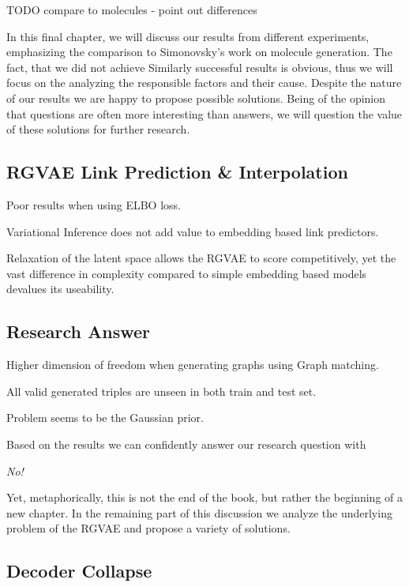 
TODO compare to molecules - point out differences

In this final chapter, we will discuss our results from different experiments, emphasizing the comparison to Simonovsky's work on molecule generation. The fact, that we did not achieve Similarly successful results is obvious, thus we will focus on the analyzing the responsible factors and their cause. Despite the nature of our results we are happy to propose possible solutions. Being of the opinion that questions are often more interesting than answers, we will question the value of these solutions for further research.

\subsection{RGVAE Link Prediction & Interpolation}


Poor results when using ELBO loss.

Variational Inference does not add value to embedding based link predictors.

Relaxation of the latent space allows the RGVAE to score competitively, yet the vast difference in complexity compared to simple embedding based models devalues its useability. 

\subsection{Research Answer}

Higher dimension of freedom when generating graphs using Graph matching.

All valid generated triples are unseen in both train and test set. 

Problem seems to be the Gaussian prior.

Based on the results we can confidently answer our research question with 
\begin{center}
    \textit{No!}
\end{center}

Yet, metaphorically, this is not the end of the book, but rather the beginning of a new chapter. In the remaining part of this discussion we analyze the underlying problem of the RGVAE and propose a variety of solutions.


\subsection{Decoder Collapse}
\label{ssec7:collapse}

